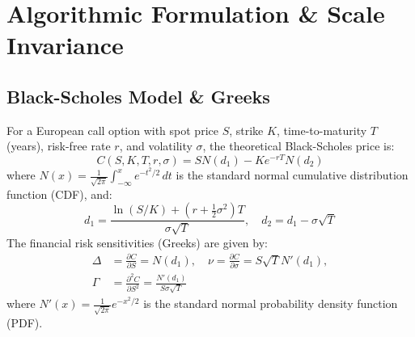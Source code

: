 \documentclass[sigconf,anonymous,review]{acmart}
\begin{document}
\section{Algorithmic Formulation \& Scale Invariance}
\subsection{Black-Scholes Model \& Greeks}
For a European call option with spot price $S$, strike $K$, time-to-maturity $T$ (years), risk-free rate $r$, and volatility $\sigma$, the theoretical Black-Scholes price is:
\begin{equation}
    C(S, K, T, r, \sigma) = S N(d_1) - K e^{-rT} N(d_2)
    \label{eq:bs_call}
\end{equation}
where $N(x) = \frac{1}{\sqrt{2\pi}} \int_{-\infty}^x e^{-t^2/2} \, dt$ is the standard normal cumulative distribution function (CDF), and:
\begin{equation}
    d_1 = \frac{\ln(S/K) + (r + \frac{1}{2}\sigma^2)T}{\sigma\sqrt{T}}, \quad d_2 = d_1 - \sigma\sqrt{T}
    \label{eq:d1_d2}
\end{equation}
The financial risk sensitivities (Greeks) are given by:
\begin{equation}
\begin{aligned}
    \Delta &= \frac{\partial C}{\partial S} = N(d_1), \quad 
    \nu = \frac{\partial C}{\partial \sigma} = S \sqrt{T} N'(d_1), \\
    \Gamma &= \frac{\partial^2 C}{\partial S^2} = \frac{N'(d_1)}{S \sigma \sqrt{T}}
\end{aligned}
    \label{eq:greeks}
\end{equation}
where $N'(x) = \frac{1}{\sqrt{2\pi}} e^{-x^2/2}$ is the standard normal probability density function (PDF).
\end{document}
